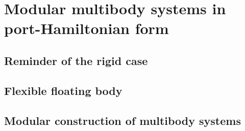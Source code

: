 \chapter{Modular multibody systems in port-Hamiltonian form}


\section{Reminder of the rigid case}

\section{Flexible floating body}

\section{Modular construction of multibody systems}





